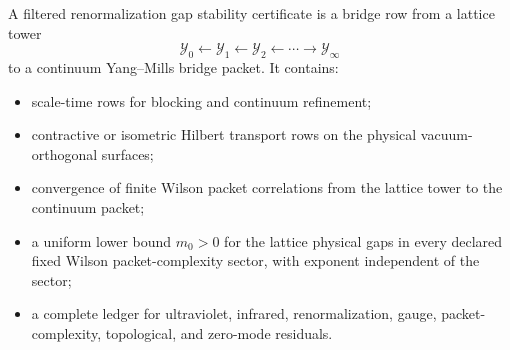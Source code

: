 \begin{definition}
\label{def:philosophy-filtered-renormalization-gap-stability-certificate}
A filtered renormalization gap stability certificate is a bridge row from a
lattice tower
$$
\mathcal Y_0\leftarrow\mathcal Y_1\leftarrow\mathcal Y_2\leftarrow\cdots
\longrightarrow \mathcal Y_{\infty}
$$
to a continuum Yang--Mills bridge packet. It contains:
\begin{itemize}
\item scale-time rows for blocking and continuum refinement;
\item contractive or isometric Hilbert transport rows on the physical
vacuum-orthogonal surfaces;
\item convergence of finite Wilson packet correlations from the lattice tower
to the continuum packet;
\item a uniform lower bound $m_0>0$ for the lattice physical gaps in every
declared fixed Wilson packet-complexity sector, with exponent independent of
the sector;
\item a complete ledger for ultraviolet, infrared, renormalization, gauge,
packet-complexity, topological, and zero-mode residuals.
\end{itemize}
\end{definition}

